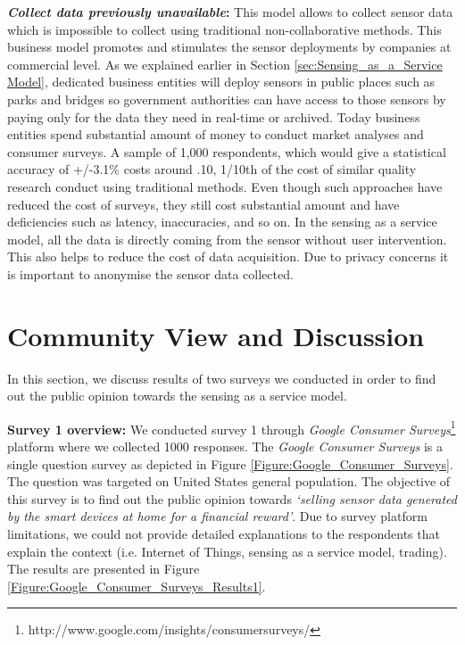 \documentclass[conference]{IEEEtran}
\begin{document}
 \textbf{\textit{Collect data previously unavailable}:} This model allows to collect sensor data which is impossible to collect using traditional non-collaborative methods. This business model promotes and stimulates the sensor deployments by companies at commercial level. As we explained earlier in Section \ref{sec:Sensing_as_a_Service Model}, dedicated business entities will deploy sensors in public places such as parks and bridges so  government authorities can have access to those sensors by paying only for the data they need in real-time or archived. Today business entities spend substantial amount of money to conduct market analyses and consumer surveys. A sample of 1,000 respondents, which would give a statistical accuracy of +/-3.1\% costs around \0.10, 1/10th of the cost of similar quality research conduct using traditional methods. Even though such approaches have reduced the cost of surveys, they still cost substantial amount and have deficiencies such as latency, inaccuracies, and so on. In the sensing as a service model, all the data is directly coming from the sensor without user intervention. This also helps to reduce the cost of data acquisition. Due to privacy concerns it is important to anonymise the sensor data collected. 
 











\section{Community View and Discussion}
\label{sec:Discussion}

In this section, we discuss results of two surveys we conducted in order  to find out the public opinion towards the sensing as a service model.

\textbf{Survey 1 overview:}  We conducted survey 1 through \textit{Google Consumer Surveys}\footnote{http://www.google.com/insights/consumersurveys/} platform where we collected 1000 responses. The \textit{Google Consumer Surveys} is a single question survey as  depicted in Figure \ref{Figure:Google_Consumer_Surveys}. The question was targeted on United States general population. The objective of this survey is to find out the public opinion towards \textit{`selling sensor data generated by the smart devices at home for a financial reward'}. Due to survey platform limitations, we could not provide detailed explanations to the respondents that explain the context (i.e. Internet of Things, sensing as a service model, trading). The results are presented in Figure \ref{Figure:Google_Consumer_Surveys_Results1}.
\end{document}
